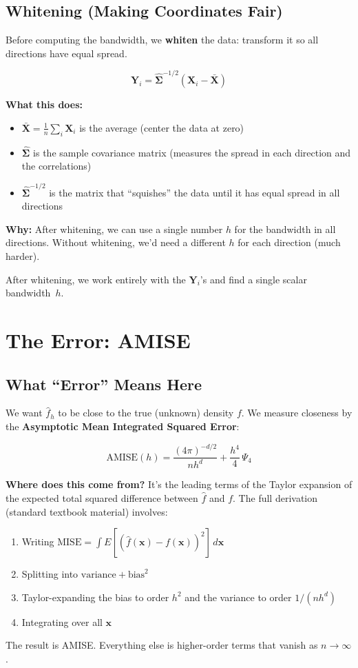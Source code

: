 \documentclass[12pt]{article}
\newcommand{\keyword}[1]{\textbf{\textcolor{blue!70!black}{#1}}}
\newcommand{\note}[1]{\begin{tcolorbox}[colback=yellow!5,colframe=yellow!60!black,breakable]\small #1\end{tcolorbox}}
\begin{document}
\subsection{Whitening (Making Coordinates Fair)}

Before computing the bandwidth, we \keyword{whiten} the data: transform it so all directions have equal spread.

$$\mathbf{Y}_i = \hat{\bm{\Sigma}}^{-1/2}(\mathbf{X}_i - \bar{\mathbf{X}})$$

\note{
\textbf{What this does:}
\begin{itemize}
\item $\bar{\mathbf{X}} = \frac{1}{n}\sum_i \mathbf{X}_i$ is the average (center the data at zero)
\item $\hat{\bm{\Sigma}}$ is the sample covariance matrix (measures the spread in each direction and the correlations)
\item $\hat{\bm{\Sigma}}^{-1/2}$ is the matrix that ``squishes'' the data until it has equal spread in all directions
\end{itemize}
\textbf{Why:} After whitening, we can use a single number $h$ for the bandwidth in all directions. Without whitening, we'd need a different $h$ for each direction (much harder).}

After whitening, we work entirely with the $\mathbf{Y}_i$'s and find a single scalar bandwidth~$h$.

\section{The Error: AMISE}

\subsection{What ``Error'' Means Here}

We want $\hat{f}_h$ to be close to the true (unknown) density $f$. We measure closeness by the \keyword{Asymptotic Mean Integrated Squared Error}:

$$\text{AMISE}(h) = \frac{(4\pi)^{-d/2}}{n h^d} + \frac{h^4}{4}\,\Psi_4$$

\note{
\textbf{Where does this come from?} It's the leading terms of the Taylor expansion of the expected total squared difference between $\hat{f}$ and $f$. The full derivation (standard textbook material) involves:
\begin{enumerate}
\item Writing $\text{MISE} = \int E[(\hat{f}(\mathbf{x}) - f(\mathbf{x}))^2]\,d\mathbf{x}$
\item Splitting into $\text{variance} + \text{bias}^2$
\item Taylor-expanding the bias to order $h^2$ and the variance to order $1/(nh^d)$
\item Integrating over all $\mathbf{x}$
\end{enumerate}
The result is AMISE. Everything else is higher-order terms that vanish as $n \to \infty$.}
\end{document}
